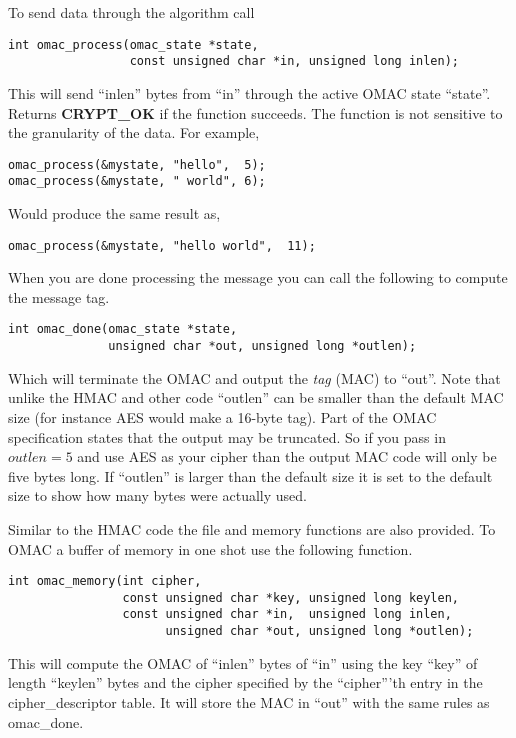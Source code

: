 \documentclass[a4paper]{book}
\begin{document}
To send data through the algorithm call
\begin{verbatim}
int omac_process(omac_state *state, 
                 const unsigned char *in, unsigned long inlen);
\end{verbatim}
This will send ``inlen'' bytes from ``in'' through the active OMAC state ``state''.  Returns \textbf{CRYPT\_OK} if the 
function succeeds.  The function is not sensitive to the granularity of the data.  For example,

\begin{verbatim}
omac_process(&mystate, "hello",  5);
omac_process(&mystate, " world", 6);
\end{verbatim}

Would produce the same result as,

\begin{verbatim}
omac_process(&mystate, "hello world",  11);
\end{verbatim}

When you are done processing the message you can call the following to compute the message tag.

\begin{verbatim}
int omac_done(omac_state *state, 
              unsigned char *out, unsigned long *outlen);
\end{verbatim}
Which will terminate the OMAC and output the \textit{tag} (MAC) to ``out''.  Note that unlike the HMAC and other code 
``outlen'' can be smaller than the default MAC size (for instance AES would make a 16-byte tag).  Part of the OMAC 
specification states that the output may be truncated.  So if you pass in $outlen = 5$ and use AES as your cipher than
the output MAC code will only be five bytes long.  If ``outlen'' is larger than the default size it is set to the default
size to show how many bytes were actually used.

Similar to the HMAC code the file and memory functions are also provided.  To OMAC a buffer of memory in one shot use the 
following function.

\begin{verbatim}
int omac_memory(int cipher, 
                const unsigned char *key, unsigned long keylen,
                const unsigned char *in,  unsigned long inlen,
                      unsigned char *out, unsigned long *outlen);
\end{verbatim}
This will compute the OMAC of ``inlen'' bytes of ``in'' using the key ``key'' of length ``keylen'' bytes and the cipher
specified by the ``cipher'''th entry in the cipher\_descriptor table.  It will store the MAC in ``out'' with the same
rules as omac\_done.
\end{document}
